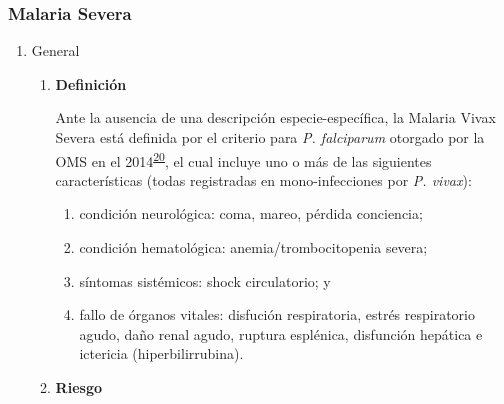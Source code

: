 \documentclass[]{article}
\providecommand{\tightlist}{%
  \setlength{\itemsep}{0pt}\setlength{\parskip}{0pt}}
\begin{document}
\subsubsection{Malaria Severa}\label{malaria-severa}

\begin{enumerate}
\def\labelenumi{\alph{enumi}.}
\item
  General

  \begin{enumerate}
  \def\labelenumii{\roman{enumii}.}
  \item
    \textbf{Definición}

    Ante la ausencia de una descripción especie-específica, la Malaria
    Vivax Severa está definida por el criterio para \emph{P. falciparum}
    otorgado por la OMS en el
    2014\textsuperscript{\protect\hyperlink{ref-WHO2014severe}{20}}, el
    cual incluye uno o más de las siguientes características (todas
    registradas en mono-infecciones por \emph{P. vivax}):

    \begin{enumerate}
    \def\labelenumiii{\arabic{enumiii}.}
    \tightlist
    \item
      condición neurológica: coma, mareo, pérdida conciencia;
    \item
      condición hematológica: anemia/trombocitopenia severa;
    \item
      síntomas sistémicos: shock circulatorio; y
    \item
      fallo de órganos vitales: disfución respiratoria, estrés
      respiratorio agudo, daño renal agudo, ruptura esplénica,
      disfunción hepática e ictericia (hiperbilirrubina).
    \end{enumerate}
  \item
    \textbf{Riesgo}


\end{enumerate}
\end{enumerate}
\end{document}
